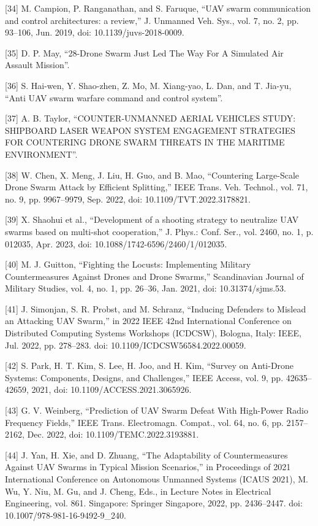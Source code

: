 [34] M. Campion, P. Ranganathan, and S. Faruque, “UAV swarm communication and control architectures: a review,” J. Unmanned Veh. Sys., vol. 7, no. 2, pp. 93–106, Jun. 2019, doi: 10.1139/juvs-2018-0009.


[35] D. P. May, “28-Drone Swarm Just Led The Way For A Simulated Air Assault Mission”.


[36] S. Hai-wen, Y. Shao-zhen, Z. Mo, M. Xiang-yao, L. Dan, and T. Jia-yu, “Anti UAV swarm warfare command and control system”.


[37] A. B. Taylor, “COUNTER-UNMANNED AERIAL VEHICLES STUDY: SHIPBOARD LASER WEAPON SYSTEM ENGAGEMENT STRATEGIES FOR COUNTERING DRONE SWARM THREATS IN THE MARITIME ENVIRONMENT”.


[38] W. Chen, X. Meng, J. Liu, H. Guo, and B. Mao, “Countering Large-Scale Drone Swarm Attack by Efficient Splitting,” IEEE Trans. Veh. Technol., vol. 71, no. 9, pp. 9967–9979, Sep. 2022, doi: 10.1109/TVT.2022.3178821.


[39] X. Shaohui et al., “Development of a shooting strategy to neutralize UAV swarms based on multi-shot cooperation,” J. Phys.: Conf. Ser., vol. 2460, no. 1, p. 012035, Apr. 2023, doi: 10.1088/1742-6596/2460/1/012035.


[40] M. J. Guitton, “Fighting the Locusts: Implementing Military Countermeasures Against Drones and Drone Swarms,” Scandinavian Journal of Military Studies, vol. 4, no. 1, pp. 26–36, Jan. 2021, doi: 10.31374/sjms.53.


[41] J. Simonjan, S. R. Probst, and M. Schranz, “Inducing Defenders to Mislead an Attacking UAV Swarm,” in 2022 IEEE 42nd International Conference on Distributed Computing Systems Workshops (ICDCSW), Bologna, Italy: IEEE, Jul. 2022, pp. 278–283. doi: 10.1109/ICDCSW56584.2022.00059.


[42] S. Park, H. T. Kim, S. Lee, H. Joo, and H. Kim, “Survey on Anti-Drone Systems: Components, Designs, and Challenges,” IEEE Access, vol. 9, pp. 42635–42659, 2021, doi: 10.1109/ACCESS.2021.3065926.


[43] G. V. Weinberg, “Prediction of UAV Swarm Defeat With High-Power Radio Frequency Fields,” IEEE Trans. Electromagn. Compat., vol. 64, no. 6, pp. 2157–2162, Dec. 2022, doi: 10.1109/TEMC.2022.3193881.


[44] J. Yan, H. Xie, and D. Zhuang, “The Adaptability of Countermeasures Against UAV Swarms in Typical Mission Scenarios,” in Proceedings of 2021 International Conference on Autonomous Unmanned Systems (ICAUS 2021), M. Wu, Y. Niu, M. Gu, and J. Cheng, Eds., in Lecture Notes in Electrical Engineering, vol. 861. Singapore: Springer Singapore, 2022, pp. 2436–2447. doi: 10.1007/978-981-16-9492-9_240.


